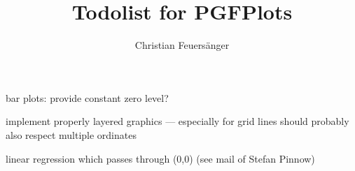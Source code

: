 \documentclass[a4paper]{article}
\author{Christian Feuers\"anger}
\title{Todolist for PGFPlots}
\begin{document}
\maketitle

\begin{bugtracker}
\begin{feature}
bar plots: provide constant zero level?
\end{feature}

\begin{feature}
 implement properly layered graphics --- especially for grid lines
  should probably also respect multiple ordinates
\end{feature}

\begin{feature}
 linear regression which passes through (0,0)  (see mail of Stefan Pinnow)
\end{feature}
\end{bugtracker}
\end{document}
